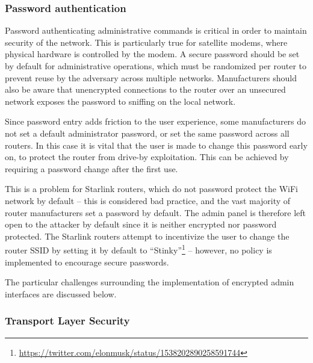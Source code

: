 

\subsubsection{Password authentication}\label{sec:password_authentication}

Password authenticating administrative commands is critical in order to maintain security of the network.
This is particularly true for satellite modems, where physical hardware is controlled by the modem.
A secure password should be set by default for administrative operations, which must be randomized per router to prevent reuse by the adversary across multiple networks.
Manufacturers should also be aware that unencrypted connections to the router over an unsecured network exposes the password to sniffing on the local network.

Since password entry adds friction to the user experience, some manufacturers do not set a default administrator password, or set the same password across all routers.
In this case it is vital that the user is made to change this password early on, to protect the router from drive-by exploitation.
This can be achieved by requiring a password change after the first use.

This is a problem for Starlink routers, which do not password protect the WiFi network by default -- this is considered bad practice, and the vast majority of router manufacturers set a password by default.
The admin panel is therefore left open to the attacker by default since it is neither encrypted nor password protected.
The Starlink routers attempt to incentivize the user to change the router SSID by setting it by default to ``Stinky''\footnote{\url{https://twitter.com/elonmusk/status/1538202890258591744}} -- however, no policy is implemented to encourage secure passwords.

The particular challenges surrounding the implementation of encrypted admin interfaces are discussed below.

\subsubsection{Transport Layer Security}

